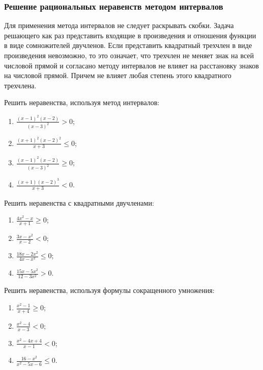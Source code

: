 \documentclass[algebra,a5paper]{pum}
\date{21.04.20}
\begin{document}
\subsubsection*{Решение рациональных неравенств методом интервалов}
Для применения метода интервалов не следует раскрывать скобки. Задача решающего как раз представить входящие в произведения и отношения функции в виде сомножителей двучленов. Если представить квадратный трехчлен в виде произведения невозможно, то это означает, что трехчлен не меняет знак на всей числовой прямой и согласано методу интервалов не влияет на расстановку знаков на числовой прямой. Причем не влияет любая степень этого квадратного трехчлена.

\begin{exercises}
  \begin{question}
    Решить неравенства, используя метод интервалов:
    \begin{multicols}{2}
      \begin{enumerate}
        \item $\frac{(x-1)^2(x-2)}{(x-3)^2}>0$;
        \item $\frac{(x+1)^2(x-2)^2}{x+3}\le0$;
        \item $\frac{(x-1)^2(x-2)}{(x-3)^2}\ge0$;
        \item $\frac{(x+1)(x-2)^3}{x+3}<0$.
      \end{enumerate}
    \end{multicols}
  \end{question}

  \begin{question}
    Решить неравенства с квадратными двучленами:
    \begin{multicols}{2}
      \begin{enumerate}
        \item $\frac{4x^2-x}{x+1}\ge0$;
        \item $\frac{3x-x^2}{x-2}<0$;
        \item $\frac{18x-2x^2}{4x-x^2}\le0$;
        \item $\frac{15x-5x^2}{12-3x^2}>0$.
      \end{enumerate}
    \end{multicols}
  \end{question}

  \begin{question}
    Решить неравенства, используя формулы сокращенного умножения:
    \begin{multicols}{2}
      \begin{enumerate}
        \item $\frac{x^2-1}{x+4}\ge0$;
        \item $\frac{x^2-4}{x-3}<0$;
        \item $\frac{x^2-4x+4}{x-1}<0$;
        \item $\frac{16-x^2}{x^2-5x-6}\le0$.
      \end{enumerate}
    \end{multicols}
  \end{question}


\end{exercises}
\end{document}
